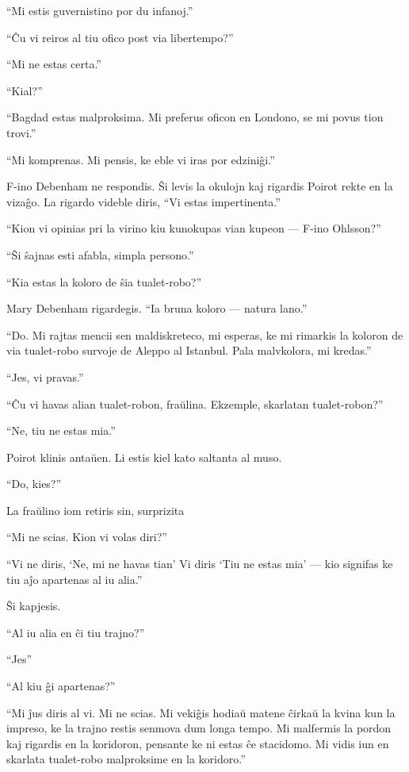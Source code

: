 ``Mi estis guvernistino por du infanoj.''

``Ĉu vi reiros al tiu ofico post via libertempo?''

``Mi ne estas certa.''

``Kial?''

``Bagdad estas malproksima. Mi preferus oficon en Londono, se mi povus tion trovi.''

``Mi komprenas. Mi pensis, ke eble vi iras por edziniĝi.''

F-ino Debenham ne respondis. Ŝi levis la okulojn kaj rigardis Poirot rekte en la vizaĝo. La rigardo videble diris, ``Vi estas impertinenta.''

``Kion vi opinias pri la virino kiu kunokupas vian kupeon --- F-ino Ohlsson?''

``Ŝi ŝajnas esti afabla, simpla persono.''

``Kia estas la koloro de ŝia tualet-robo?''

Mary Debenham rigardegis. ``Ia bruna koloro --- natura lano.''

``Do. Mi rajtas mencii sen maldiskreteco, mi esperas, ke mi rimarkis la koloron de via tualet-robo survoje de Aleppo al Istanbul. Pala malvkolora, mi kredas.''

``Jes, vi pravas.''

``Ĉu vi havas alian tualet-robon, fraŭlina. Ekzemple, skarlatan tualet-robon?''

``Ne, tiu ne estas mia.''

Poirot klinis antaŭen. Li estis kiel kato saltanta al muso.

``Do, kies?''

La fraŭlino iom retiris sin, surprizita

``Mi ne scias. Kion vi volas diri?''

``Vi ne diris, `Ne, mi ne havas tian' Vi diris `Tiu ne estas mia' --- kio signifas ke tiu aĵo apartenas al iu alia.''

Ŝi kapjesis.

``Al iu alia en ĉi tiu trajno?''

``Jes''

``Al kiu ĝi apartenas?''

``Mi ĵus diris al vi. Mi ne scias. Mi vekiĝis hodiaŭ matene ĉirkaŭ la kvina kun la impreso, ke la trajno restis senmova dum longa tempo. Mi malfermis la pordon kaj rigardis en la koridoron, pensante ke ni estas ĉe stacidomo. Mi vidis iun en skarlata tualet-robo malproksime en la koridoro.''

